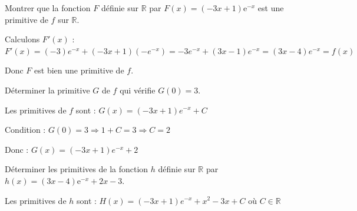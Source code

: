 \documentclass[11pt,a4paper]{article}  %
\begin{document}
\begin{enumMet}
	\item Montrer que la fonction $F$ définie sur $\mathbb{R}$ par $F(x)=(-3 x+1) \mathrm{e}^{-x}$ est une primitive de $f$ sur $\mathbb{R}$.
	\begin{corrBox}
		Calculons $F'(x)$ :
		$F'(x) = (-3)e^{-x} + (-3x+1)(-e^{-x}) = -3e^{-x} + (3x-1)e^{-x} = (3x-4)e^{-x} = f(x)$
		
		Donc $F$ est bien une primitive de $f$.		
	\end{corrBox}
	\item Déterminer la primitive $G$ de $f$ qui vérifie $G(0)=3$.
	\begin{corrBox}
		Les primitives de $f$ sont : $G(x) = (-3x+1)e^{-x} + C$
		
		Condition : $G(0) = 3 \Rightarrow 1 + C = 3 \Rightarrow C = 2$
		
		Donc : $G(x) = (-3x+1)e^{-x} + 2$		
	\end{corrBox}
	\item Déterminer les primitives de la fonction $h$ définie sur $\mathbb{R}$ par $h(x)=(3 x-4) \mathrm{e}^{-x}+2 x-3$.
	
	\begin{corrBox}
		Les primitives de $h$ sont :
		$H(x) = (-3x+1)e^{-x} + x^2 - 3x + C$ où $C \in \mathbb{R}$		
	\end{corrBox}
\end{enumMet}

\vspace*{-0.5cm}
\exerciceDS{}
\end{document}

